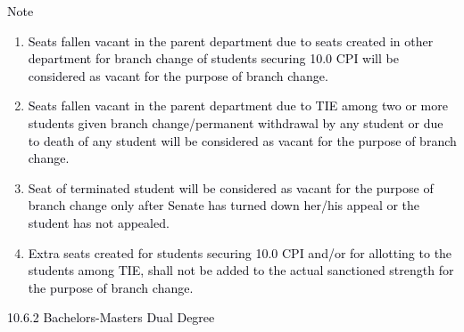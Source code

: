 \documentclass[12pt]{article}
\begin{document}
{\fontsize{10pt}{12.0pt}\selectfont \textcolor[HTML]{00000A}{Note}\par}\par


\vspace{\baselineskip}
\begin{enumerate}
	\item {\fontsize{10pt}{12.0pt}\selectfont \textcolor[HTML]{00000A}{Seats fallen vacant in the parent department due to seats created in other department for branch change of students securing 10.0 CPI will be considered as vacant for the purpose of branch change.}\par}\par


\vspace{\baselineskip}
	\item {\fontsize{9pt}{10.8pt}\selectfont \textcolor[HTML]{00000A}{Seats fallen vacant in the parent department due to TIE among two or more students given branch change/permanent withdrawal by any student or due to death of any student will be considered as vacant for the purpose of branch change.}\par}\par


\vspace{\baselineskip}
	\item {\fontsize{10pt}{12.0pt}\selectfont \textcolor[HTML]{00000A}{Seat of terminated student will be considered as vacant for the purpose of branch change only after Senate has turned down her/his appeal or the student has not appealed.}\par}\par


\vspace{\baselineskip}
	\item {\fontsize{10pt}{12.0pt}\selectfont \textcolor[HTML]{00000A}{Extra seats created for students securing 10.0 CPI and/or for allotting to the students among TIE, shall not be added to the actual sanctioned strength for the purpose of branch change.}\par}
\end{enumerate}\par


\vspace{\baselineskip}
{\fontsize{10pt}{12.0pt}\selectfont \textcolor[HTML]{00000A}{10.6.2 Bachelors-Masters Dual Degree}\par}\par
\end{document}
